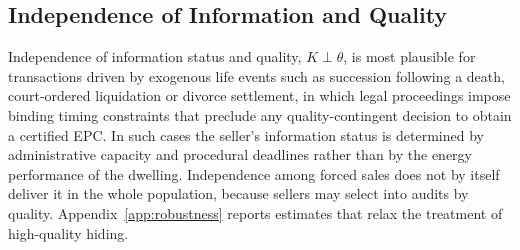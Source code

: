 \subsection*{Independence of Information and Quality}
\label{app:independence}

Independence of information status and quality, $K\perp\theta$, is most plausible for transactions driven by exogenous life events such as succession following a death, court-ordered liquidation or divorce settlement, in which legal proceedings impose binding timing constraints that preclude any quality-contingent decision to obtain a certified EPC. In such cases the seller's information status is determined by administrative capacity and procedural deadlines rather than by the energy performance of the dwelling. Independence among forced sales does not by itself deliver it in the whole population, because sellers may select into audits by quality. Appendix~\ref{app:robustness} reports estimates that relax the treatment of high-quality hiding.
